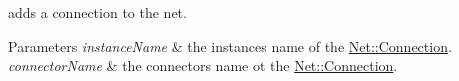 adds a connection to the net. 


\begin{DoxyParams}{Parameters}
{\em instance\+Name} & the instance\textquotesingle{}s name of the \hyperlink{class_open_chams_1_1_net_1_1_connection}{Net\+::\+Connection}. \\
\hline
{\em connector\+Name} & the connector\textquotesingle{}s name ot the \hyperlink{class_open_chams_1_1_net_1_1_connection}{Net\+::\+Connection}. \\
\hline
\end{DoxyParams}
